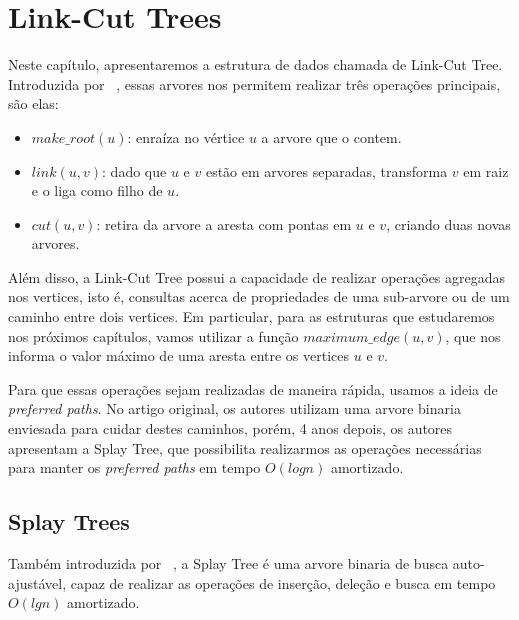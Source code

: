
\chapter{Link-Cut Trees}
\label{cap:link-cut-trees}

Neste capítulo, apresentaremos a estrutura de dados chamada de Link-Cut Tree. Introduzida por ~\citet{10.1145/800076.802464}, essas arvores nos permitem realizar três operações principais, são elas:

\begin{itemize}
    \item $make\_root(u)$: enraíza no vértice $u$ a arvore que o contem.
    \item $link(u, v)$: dado que $u$ e $v$ estão em arvores separadas, transforma $v$ em raiz e o liga como filho de $u$.
    \item $cut(u, v)$: retira da arvore a aresta com pontas em $u$ e $v$, criando duas novas arvores.
\end{itemize}

Além disso, a Link-Cut Tree possui a capacidade de realizar operações agregadas nos vertices, isto é, consultas acerca de propriedades de uma sub-arvore ou de um caminho entre dois vertices. Em particular, para as estruturas que estudaremos nos próximos capítulos, vamos utilizar a função $maximum\_edge(u, v)$, que nos informa o valor máximo de uma aresta entre os vertices $u$ e $v$.

Para que essas operações sejam realizadas de maneira rápida, usamos a ideia de \textit{preferred paths}. No artigo original, os autores utilizam uma arvore binaria enviesada para cuidar destes caminhos, porém, 4 anos depois, os autores apresentam a Splay Tree, que possibilita realizarmos as operações necessárias para manter os \textit{preferred paths} em tempo $O(logn)$ amortizado.

\section{Splay Trees}
\label{sec:splay-trees}

Também introduzida por ~\citet{10.1145/3828.3835}, a Splay Tree é uma arvore binaria de busca auto-ajustável, capaz de realizar as operações de inserção, deleção e busca em tempo $O(lg n)$ amortizado.
